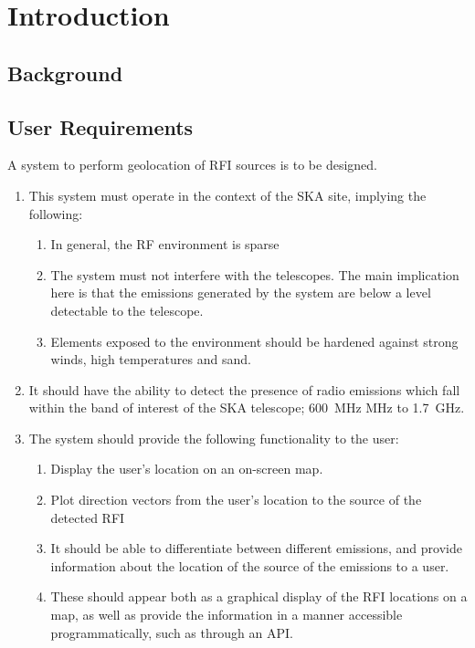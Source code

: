 \chapter{Introduction}
\section{Background}

\section{User Requirements}

A system to perform geolocation of RFI sources is to be designed.
\begin{enumerate}
  \item This system must operate in the context of the SKA site, implying the following:
  \begin{enumerate}
    \item In general, the RF environment is sparse
    \item The system must not interfere with the telescopes. The main implication here is that the emissions generated by the system are below a level detectable to the telescope. 
    \item  Elements exposed to the environment should be hardened against strong winds, high temperatures and sand.
  \end{enumerate}

  \item It should have the ability to detect the presence of radio emissions which fall within the band of interest of the SKA telescope; \SI{600}{\mega\hertz} MHz to \SI{1.7}{\giga\hertz}.
    
  \item The system should provide the following functionality to the user:
  \begin{enumerate}
    \item Display the user's location on an on-screen map.
    \item Plot direction vectors from the user's location to the source of the detected RFI
    \item It should be able to differentiate between different emissions, and provide information about the location of the source of the emissions to a user. 
    \item These should appear both as a graphical display of the RFI locations on a map, as well as provide the information in a manner accessible programmatically, such as through an API. 
  \end{enumerate}


\end{enumerate}
